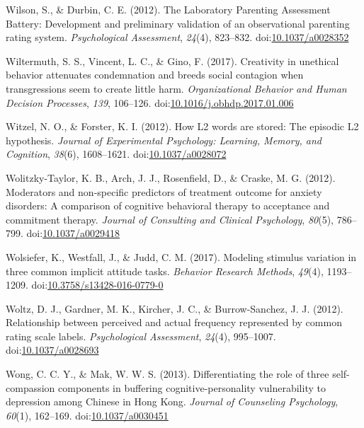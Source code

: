 \documentclass[english,man]{apa6}
\theoremstyle{definition}
\theoremstyle{definition}
\theoremstyle{definition}
\theoremstyle{remark}
\begin{document}
\hypertarget{ref-Wilson2012}{}
Wilson, S., \& Durbin, C. E. (2012). The Laboratory Parenting Assessment
Battery: Development and preliminary validation of an observational
parenting rating system. \emph{Psychological Assessment}, \emph{24}(4),
823--832. doi:\href{https://doi.org/10.1037/a0028352}{10.1037/a0028352}

\hypertarget{ref-Wiltermuth2017}{}
Wiltermuth, S. S., Vincent, L. C., \& Gino, F. (2017). Creativity in
unethical behavior attenuates condemnation and breeds social contagion
when transgressions seem to create little harm. \emph{Organizational
Behavior and Human Decision Processes}, \emph{139}, 106--126.
doi:\href{https://doi.org/10.1016/j.obhdp.2017.01.006}{10.1016/j.obhdp.2017.01.006}

\hypertarget{ref-Witzel2012}{}
Witzel, N. O., \& Forster, K. I. (2012). How L2 words are stored: The
episodic L2 hypothesis. \emph{Journal of Experimental Psychology:
Learning, Memory, and Cognition}, \emph{38}(6), 1608--1621.
doi:\href{https://doi.org/10.1037/a0028072}{10.1037/a0028072}

\hypertarget{ref-Wolitzky-Taylor2012}{}
Wolitzky-Taylor, K. B., Arch, J. J., Rosenfield, D., \& Craske, M. G.
(2012). Moderators and non-specific predictors of treatment outcome for
anxiety disorders: A comparison of cognitive behavioral therapy to
acceptance and commitment therapy. \emph{Journal of Consulting and
Clinical Psychology}, \emph{80}(5), 786--799.
doi:\href{https://doi.org/10.1037/a0029418}{10.1037/a0029418}

\hypertarget{ref-Wolsiefer2017}{}
Wolsiefer, K., Westfall, J., \& Judd, C. M. (2017). Modeling stimulus
variation in three common implicit attitude tasks. \emph{Behavior
Research Methods}, \emph{49}(4), 1193--1209.
doi:\href{https://doi.org/10.3758/s13428-016-0779-0}{10.3758/s13428-016-0779-0}

\hypertarget{ref-Woltz2012}{}
Woltz, D. J., Gardner, M. K., Kircher, J. C., \& Burrow-Sanchez, J. J.
(2012). Relationship between perceived and actual frequency represented
by common rating scale labels. \emph{Psychological Assessment},
\emph{24}(4), 995--1007.
doi:\href{https://doi.org/10.1037/a0028693}{10.1037/a0028693}

\hypertarget{ref-Wong2013}{}
Wong, C. C. Y., \& Mak, W. W. S. (2013). Differentiating the role of
three self-compassion components in buffering cognitive-personality
vulnerability to depression among Chinese in Hong Kong. \emph{Journal of
Counseling Psychology}, \emph{60}(1), 162--169.
doi:\href{https://doi.org/10.1037/a0030451}{10.1037/a0030451}
\end{document}
